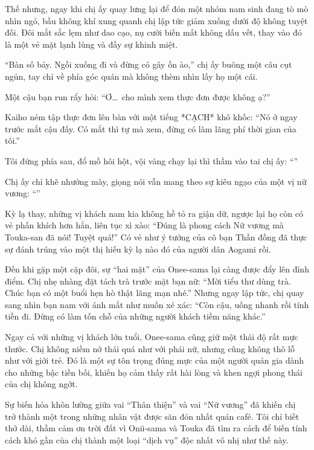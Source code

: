 \documentclass[../main.tex]{subfiles}
\begin{document}
Thế nhưng, ngay khi chị ấy quay lưng lại để đón một nhóm nam sinh đang tò mò nhìn ngó, bầu không khí xung quanh chị lập tức giảm xuống dưới độ không tuyệt đối. Đôi mắt sắc lẹm như dao cạo, nụ cười biến mất không dấu vết, thay vào đó là một vẻ mặt lạnh lùng và đầy sự khinh miệt.

``Bàn số bảy. Ngồi xuống đi và đừng có gây ồn ào,'' chị ấy buông một câu cụt ngủn, tay chỉ về phía góc quán mà không thèm nhìn lấy họ một cái.

Một cậu bạn run rẩy hỏi: ``Ơ\dots\ cho mình xem thực đơn được không ạ?''

Kaiho ném tập thực đơn lên bàn với một tiếng *CẠCH* khô khốc: ``Nó ở ngay trước mắt cậu đấy. Có mắt thì tự mà xem, đừng có làm lãng phí thời gian của tôi.''

Tôi đứng phía sau, đổ mồ hôi hột, vội vàng chạy lại thì thầm vào tai chị ấy: ``''

Chị ấy chỉ khẽ nhướng mày, giọng nói vẫn mang theo sự kiêu ngạo của một vị nữ vương: ``''

Kỳ lạ thay, những vị khách nam kia không hề tỏ ra giận dữ, ngược lại họ còn có vẻ phấn khích hơn hẳn, liên tục xì xào: ``Đúng là phong cách Nữ vương mà Touka-san đã nói! Tuyệt quá!'' Có vẻ như ý tưởng của cô bạn Thần đồng đã thực sự đánh trúng vào một thị hiếu kỳ lạ nào đó của người dân Aogami rồi.

Đến khi gặp một cặp đôi, sự ``hai mặt'' của Onee-sama lại càng được đẩy lên đỉnh điểm. Chị nhẹ nhàng đặt tách trà trước mặt bạn nữ: ``Mời tiểu thư dùng trà. Chúc bạn có một buổi hẹn hò thật lãng mạn nhé.'' Nhưng ngay lập tức, chị quay sang nhìn bạn nam với ánh mắt như muốn xé xác: ``Còn cậu, uống nhanh rồi tính tiền đi. Đừng có làm tốn chỗ của những người khách tiềm năng khác.''

Ngay cả với những vị khách lớn tuổi, Onee-sama cũng giữ một thái độ rất mực thước. Chị không niềm nở thái quá như với phái nữ, nhưng cũng không thô lỗ như với giới trẻ. Đó là một sự tôn trọng đúng mực của một người quản gia dành cho những bậc tiền bối, khiến họ cảm thấy rất hài lòng và khen ngợi phong thái của chị không ngớt.

Sự biến hóa khôn lường giữa vai ``Thân thiện'' và vai ``Nữ vương'' đã khiến chị trở thành một trong những nhân vật được săn đón nhất quán café. Tôi chỉ biết thở dài, thầm cảm ơn trời đất vì Onii-sama và Touka đã tìm ra cách để biến tính cách khó gần của chị thành một loại ``dịch vụ'' độc nhất vô nhị như thế này.
\end{document}
